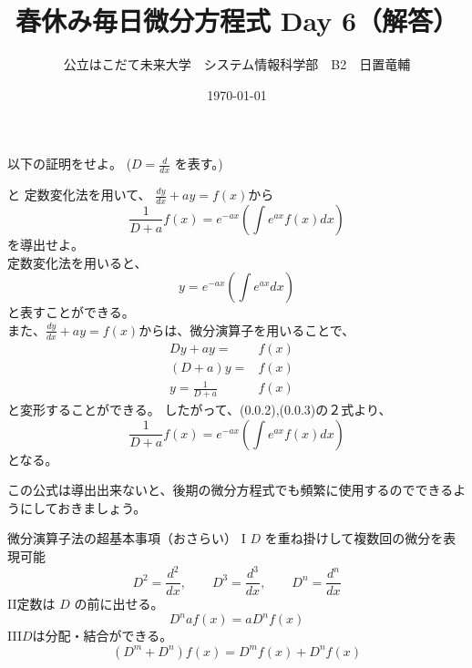 \documentclass[dvipdfmx,uplatex]{jsarticle}
\title{春休み毎日微分方程式 Day 6（解答）}
\author{公立はこだて未来大学　システム情報科学部　B2　日置竜輔}
\date{\today}
\begin{document}
\begin{spacing}{1.6}
\maketitle

以下の証明をせよ。 ($ \displaystyle D = \frac{d}{dx} $ を表す。)
\begin{qparts}
     と {\bm 定数変化法}を用いて、
    $ \displaystyle \frac{dy}{dx} + ay = f(x) から $
    \begin{equation}
      \frac{1}{D + a}f(x) = e ^ {-ax} \left(\int e ^ {ax} f(x) dx \right )
    \end{equation}を導出せよ。 \\
    定数変化法を用いると、
    \begin{equation}
      y = e ^ {-ax} \left( \int e^{ax}dx \right)
    \end{equation}
    と表すことができる。\\
    また、$ \displaystyle \frac{dy}{dx} + ay = f(x) から $は、微分演算子を用いることで、\\
    \begin{eqnarray}
      Dy + ay =  & f(x) & \nonumber \\
      (D + a)y = & f(x) & \nonumber \\
      y = \frac{1}{D + a} & f(x) &
      \end{eqnarray}
      と変形することができる。
    したがって、(0.0.2),(0.0.3)の２式より、\\
    \begin{equation*}
      \frac{1}{D + a}f(x) = e ^ {-ax} \left(\int e ^ {ax} f(x) dx \right )
    \end{equation*}
    となる。\\
  \end{qparts}
  この公式は導出出来ないと、後期の微分方程式でも頻繁に使用するのでできるようにしておきましょう。\\
  \begin{itembox}{微分演算子法の超基本事項（おさらい）}
    {\rm I} \quad $ D $ を重ね掛けして複数回の微分を表現可能 \\
    \begin{equation*}
      D^2 = \frac{d^2}{dx},\qquad D^3 = \frac{d ^ 3}{dx}, \qquad D ^ n = \frac{d^n}{dx}
    \end{equation*}
    {\rm II}\quad 定数は $ D $ の前に出せる。\\
    \begin{equation*}
      D^naf(x) = aD^nf(x)
    \end{equation*}
    {\rm III}\quad $ D $は分配・結合ができる。\\
    \begin{equation*}
      (D ^ m + D ^ n)f(x) = D^mf(x) + D^nf(x)
    \end{equation*}
  \end{itembox}
\end{spacing}
\end{document}
